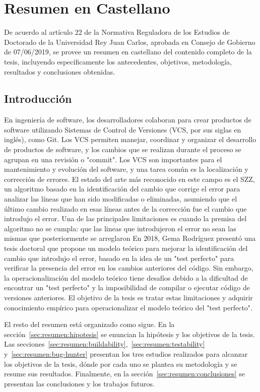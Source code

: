 \chapter{Resumen en Castellano}

De acuerdo al artículo 22 de la Normativa Reguladora de los Estudios de Doctorado de la Universidad Rey Juan Carlos, aprobada en Consejo de Gobierno de 07/06/2019, se provee un resumen en castellano del contenido completo de la tesis, incluyendo específicamente los antecedentes, objetivos, metodología, resultados y conclusiones obtenidas.

\section{Introducción}

En ingeniería de software, los desarrolladores colaboran para crear productos de software utilizando Sistemas de Control de Versiones (VCS, por sus siglas en inglés), como Git. 
Los VCS permiten manejar, coordinar y organizar el desarrollo de productos de software, y los cambios que se realizan durante el proceso se agrupan en una revisión o "commit". 
Los VCS son importantes para el mantenimiento y evolución del software, y una tarea común es la localización y corrección de errores. 
El estado del arte más reconocido en este campo es el SZZ, un algoritmo basado en la identificación del cambio que corrige el error para analizar las líneas que han sido modificadas o eliminadas, asumiendo que el último cambio realizado en esas líneas antes de la corrección fue el cambio que introdujo el error. 
Una de las principales limitaciones es cuando la premisa del algoritmo no se cumpla: que las lineas que introdujeron el error no sean
las mismas que posteriormente se arreglaron
En 2018, Gema Rodríguez presentó una tesis doctoral que propone un modelo teórico para mejorar la identificación del cambio que introdujo el error, basado en la idea de un "test perfecto" para verificar la presencia del error en los cambios anteriores del código. 
Sin embargo, la operacionalización del modelo teórico tiene desafíos debido a la dificultad de encontrar un "test perfecto" y la imposibilidad de compilar o ejecutar código de versiones anteriores. 
El objetivo de la tesis es tratar estas limitaciones y adquirir conocimiento empírico para operacionalizar el modelo teórico del "test perfecto".

El resto del resumen está organizado como sigue. En la sección~\ref{sec:resumen:hipotesis} se enuncian la hipótesis y los objetivos de la tesis. 
Las secciones~\ref{sec:resumen:buildability},~\ref{sec:resumen:testability} y~\ref{sec:resumen:bug-hunter} presentan los tres estudios realizados para alcanzar los objetivos de la tesis, dónde por cada uno se plantea su metodología y se resume sus resultados.
Finalmente, en la sección~\ref{sec:resumen:conclusiones} se presentan las conclusiones y los trabajos futuros. 

